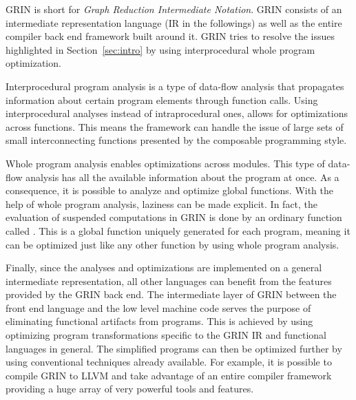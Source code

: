 \documentclass[main.tex]{subfiles}
\begin{document}
	
	GRIN is short for \emph{Graph Reduction Intermediate Notation}. GRIN consists of an intermediate representation language (IR in the followings) as well as the entire compiler back end framework built around it. GRIN tries to resolve the issues highlighted in Section~\ref{sec:intro} by using interprocedural whole program optimization. 
	
	Interprocedural program analysis is a type of data-flow analysis that propagates information about certain program elements through function calls. Using interprocedural analyses instead of intraprocedural ones, allows for optimizations across functions. This means the framework can handle the issue of large sets of small interconnecting functions presented by the composable programming style. 
	
	Whole program analysis enables optimizations across modules. This type of data-flow analysis has all the available information about the program at once. As a consequence, it is possible to analyze and optimize global functions. With the help of whole program analysis, laziness can be made explicit. In fact, the evaluation of suspended computations in GRIN is done by an ordinary function called . This is a global function uniquely generated for each program, meaning it can be optimized just like any other function by using whole program analysis. 
	
	Finally, since the analyses and optimizations are implemented on a general intermediate representation, all other languages can benefit from the features provided by the GRIN back end. The intermediate layer of GRIN between the front end language and the low level machine code serves the purpose of eliminating functional artifacts from programs. This is achieved by using optimizing program transformations specific to the GRIN IR and functional languages in general. The simplified programs can then be optimized further by using conventional techniques already available. For example, it is possible to compile GRIN to LLVM and take advantage of an entire compiler framework providing a huge array of very powerful tools and features.
	
	
\end{document}
